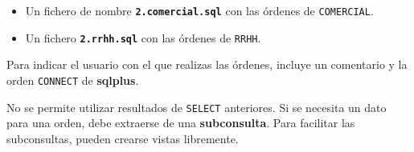 \begin{homeworkProblem}
  \begin{Aviso}
    \begin{itemize}
    \item Un fichero de nombre \textbf{\texttt{2.comercial.sql}} con las órdenes de \texttt{COMERCIAL}.
    \item Un fichero \textbf{\texttt{2.rrhh.sql}} con las órdenes de \texttt{RRHH}.
    \end{itemize}

    Para indicar el usuario con el que realizas las órdenes, incluye un comentario y la orden  \texttt{CONNECT} de \textbf{sqlplus}.
    
    No se permite utilizar resultados de \texttt{SELECT} anteriores. Si se necesita un dato para una orden, debe extraerse de una \textbf{subconsulta}. Para facilitar las subconsultas, pueden crearse vistas libremente.
  \end{Aviso}

\end{homeworkProblem}


